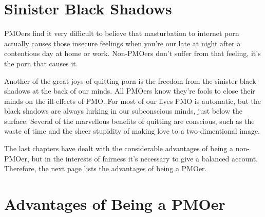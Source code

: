 \documentclass[easypeasy.tex]{subfiles}
\begin{document}
\section{Sinister Black Shadows}

PMOers find it very difficult to believe that masturbation to internet porn actually causes those insecure feelings when you're our late at night after a contentious day at home or work. Non-PMOers don't suffer from that feeling, it's the porn that causes it.

Another of the great joys of quitting porn is the freedom from the sinister black shadows at the back of our minds. All PMOers know they're fools to close their minds on the ill-effects of PMO. For most of our lives PMO is automatic, but the black shadows are always lurking in our subconscious minds, just below the surface. Several of the marvellous benefits of quitting are conscious, such as the waste of time and the sheer stupidity of making love to a two-dimentional image. 

The last chapters have dealt with the considerable advantages of being a non-PMOer, but in the interests of fairness it's necessary to give a balanced account. Therefore, the next page lists the advantages of being a PMOer.

\newpage
\section{Advantages of Being a PMOer}
\end{document}
